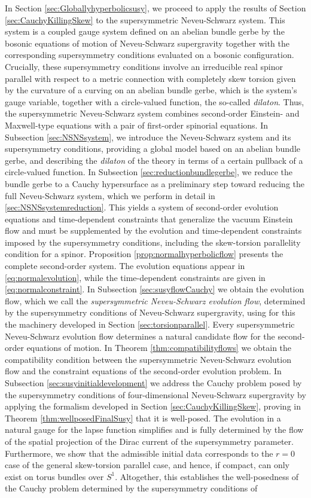 \documentclass[10pt,reqno,a4paper]{amsart}
\theoremstyle{plain}
\theoremstyle{definition}
\theoremstyle{remark}
\theoremstyle{remark}
\renewcommand{\(}{ (}
\renewcommand{\)}{ )}
\begin{document}
In Section \ref{sec:Globallyhyperbolicsusy}, we proceed to apply the results of Section \ref{sec:CauchyKillingSkew} to the supersymmetric Neveu-Schwarz system. This system is a coupled gauge system defined on an abelian bundle gerbe by the bosonic equations of motion of Neveu-Schwarz supergravity together with the corresponding supersymmetry conditions evaluated on a bosonic configuration. Crucially, these supersymmetry conditions involve an irreducible real spinor parallel with respect to a metric connection with completely skew torsion given by the curvature of a curving on an abelian bundle gerbe, which is the system's gauge variable, together with a circle-valued function, the so-called \emph{dilaton}. Thus, the supersymmetric Neveu-Schwarz system combines second-order Einstein- and Maxwell-type equations with a pair of first-order spinorial equations. In Subsection \ref{sec:NSNSsystem}, we introduce the Neveu-Schwarz system and its supersymmetry conditions, providing a global model based on an abelian bundle gerbe, and describing the \emph{dilaton} of the theory in terms of a certain pullback of a circle-valued function. In Subsection \ref{sec:reductionbundlegerbe}, we reduce the bundle gerbe to a Cauchy hypersurface as a preliminary step toward reducing the full Neveu-Schwarz system, which we perform in detail in \ref{sec:NSNSsystemreduction}. This yields a system of second-order evolution equations and time-dependent constraints that generalize the vacuum Einstein flow and must be supplemented by the evolution and time-dependent constraints imposed by the supersymmetry conditions, including the skew-torsion parallelity condition for a spinor. Proposition \ref{prop:normalhyperbolicflow} presents the complete second-order system. The evolution equations appear in \eqref{eq:normalevolution}, while the time-dependent constraints are given in \eqref{eq:normalconstraint}. In Subsection \ref{sec:susyflowCauchy} we obtain the evolution flow, which we call the \emph{supersymmetric Neveu-Schwarz evolution flow}, determined by the supersymmetry conditions of Neveu-Schwarz supergravity, using for this the machinery developed in Section \ref{sec:torsionparallel}. Every supersymmetric Neveu-Schwarz evolution flow determines a natural candidate flow for the second-order equations of motion. In Theorem \ref{thm:compatibilityflows} we obtain the compatibility condition between the supersymmetric Neveu-Schwarz evolution flow and the constraint equations of the second-order evolution problem. In Subsection \ref{sec:susyinitialdevelopment} we address the Cauchy problem posed by the supersymmetry conditions of four-dimensional Neveu-Schwarz supergravity by applying the formalism developed in Section \ref{sec:CauchyKillingSkew}, proving in Theorem \ref{thm:wellposedFinalSusy} that it is well-posed. The evolution in a natural gauge for the lapse function simplifies and is fully determined by the flow of the spatial projection of the Dirac current of the supersymmetry parameter. Furthermore, we show that the admissible initial data corresponds to the $r=0$ case of the general skew-torsion parallel case, and hence, if compact, can only exist on torus bundles over $S^1$. Altogether, this establishes the well-posedness of the Cauchy problem determined by the supersymmetry conditions of 
\end{document}
